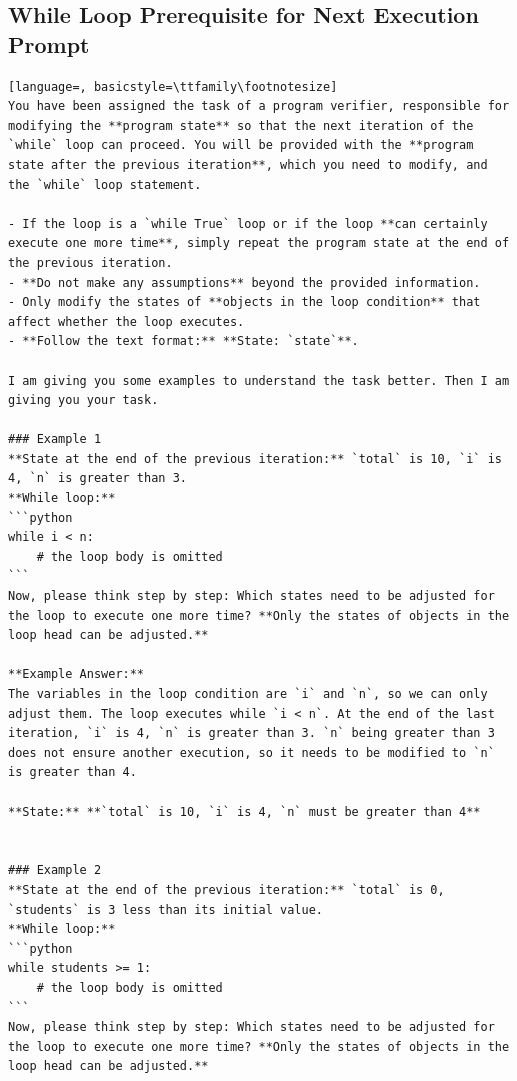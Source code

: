\documentclass[sigconf]{acmart}
\begin{document}
\subsection{While Loop Prerequisite for Next Execution Prompt}
\label{while_next_prompt}
\begin{tcolorbox}[ colback=gray!10, colframe=black, arc=5pt]
\begin{lstlisting}[language=, basicstyle=\ttfamily\footnotesize]
You have been assigned the task of a program verifier, responsible for modifying the **program state** so that the next iteration of the `while` loop can proceed. You will be provided with the **program state after the previous iteration**, which you need to modify, and the `while` loop statement.

- If the loop is a `while True` loop or if the loop **can certainly execute one more time**, simply repeat the program state at the end of the previous iteration.
- **Do not make any assumptions** beyond the provided information.
- Only modify the states of **objects in the loop condition** that affect whether the loop executes.
- **Follow the text format:** **State: `state`**.

I am giving you some examples to understand the task better. Then I am giving you your task.

### Example 1  
**State at the end of the previous iteration:** `total` is 10, `i` is 4, `n` is greater than 3.  
**While loop:**  
```python
while i < n:
    # the loop body is omitted
```
Now, please think step by step: Which states need to be adjusted for the loop to execute one more time? **Only the states of objects in the loop head can be adjusted.**

**Example Answer:**  
The variables in the loop condition are `i` and `n`, so we can only adjust them. The loop executes while `i < n`. At the end of the last iteration, `i` is 4, `n` is greater than 3. `n` being greater than 3 does not ensure another execution, so it needs to be modified to `n` is greater than 4.

**State:** **`total` is 10, `i` is 4, `n` must be greater than 4**


### Example 2  
**State at the end of the previous iteration:** `total` is 0, `students` is 3 less than its initial value.  
**While loop:**  
```python
while students >= 1:
    # the loop body is omitted
```
Now, please think step by step: Which states need to be adjusted for the loop to execute one more time? **Only the states of objects in the loop head can be adjusted.**


\end{lstlisting}
\end{tcolorbox}
\end{document}

